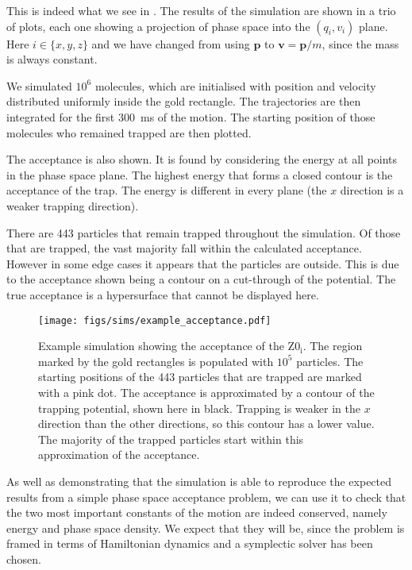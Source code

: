 This is indeed what we see in . The results of
the simulation are shown in a trio of plots, each one showing a projection of
phase space into the $(q_i, v_i)$ plane. Here $i\in\{x, y, z\}$ and we have
changed from using $\mathbf{p}$ to $\mathbf{v} = \mathbf{p} / m$, since the
mass is always constant. 

We simulated $10^6$ \CaF{} molecules, which are initialised with position and
velocity distributed uniformly inside the gold rectangle. The trajectories are
then integrated for the first \SI{300}{\milli\second} of the motion. The
starting position of those molecules who remained trapped are then plotted.

The acceptance is also shown. It is found by considering the energy at all
points in the phase space plane. The highest energy that forms a closed contour
is the acceptance of the trap. The energy is different in every plane (the $x$
direction is a weaker trapping direction).

There are 443 particles that remain trapped throughout the simulation. Of those
that are trapped, the vast majority fall within the calculated acceptance.
However in some edge cases it appears that the particles are outside. This is
due to the acceptance shown being a contour on a cut-through of the potential.
The true acceptance is a hypersurface that cannot be displayed here.

\begin{figure}
  \centering
  \texttt{[image: figs/sims/example\_acceptance.pdf]}
  \caption{Example simulation showing the acceptance of the $\mathrm{Z0_i}$.
  The region marked by the gold rectangles is populated with $10^5$ particles.
  The starting positions of the 443 particles that are trapped are marked with a pink dot.
  The acceptance is approximated by a contour of the trapping potential, shown
  here in black. Trapping is weaker in the $x$ direction than the other
  directions, so this contour has a lower value. The majority of the trapped
  particles start within this approximation of the acceptance.}
  \label{design:fig:acceptance}
\end{figure}

As well as demonstrating that the simulation is able to reproduce the expected
results from a simple phase space acceptance problem, we can use it to check
that the two most important constants of the motion are indeed conserved,
namely energy and phase space density. We expect that they will be, since the
problem is framed in terms of Hamiltonian dynamics and a symplectic solver has
been chosen.


